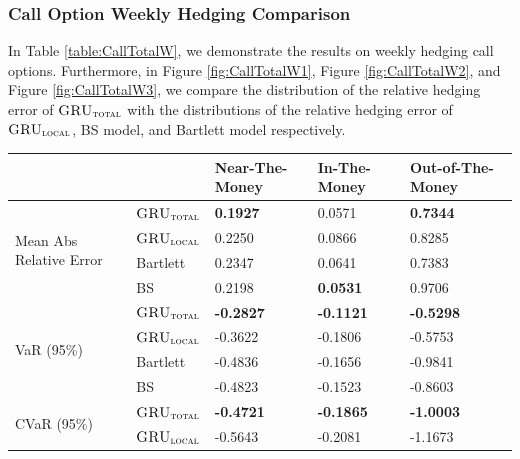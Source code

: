 \documentclass[letterpaper,12pt,titlepage,oneside,final]{book}
\numberwithin{equation}{section}
\theoremstyle{definition}
\newcommand{\modelT}{\textsc{GRU}_{\textsc{total}}}
\newcommand{\modelL}{\textsc{GRU}_{\textsc{local}}}
\begin{document}
\subsubsection{Call Option Weekly Hedging Comparison}
In Table \ref{table:CallTotalW}, we demonstrate the results on weekly hedging call options. Furthermore, in Figure \ref{fig:CallTotalW1}, Figure \ref{fig:CallTotalW2}, and  Figure \ref{fig:CallTotalW3}, we compare the distribution of the relative hedging error of $\modelT$ with the distributions of the relative hedging error of $\modelL$, BS model, and Bartlett model respectively.
\begin{table}[htp!]
	\centering
	\begin{tabular}{ll|l|l|l|}
		\cline{3-5}
		&          & Near-The-Money   & In-The-Money     & Out-of-The-Money \\ \hline
		\multicolumn{1}{|l|}{\multirow{4}{*}{Mean Abs Relative Error}} & $\modelT$    & \textbf{0.1927}  & 0.0571  & \textbf{0.7344}  \\  
		\multicolumn{1}{|l|}{}                                & $\modelL$    & 0.2250           & 0.0866           & 0.8285           \\  
		\multicolumn{1}{|l|}{}                                & Bartlett & 0.2347           & 0.0641           & 0.7383           \\  
		\multicolumn{1}{|l|}{}                                & BS       & 0.2198           &\textbf{0.0531}           & 0.9706           \\ \hline
		\multicolumn{1}{|l|}{\multirow{4}{*}{VaR (95\%)}}     & $\modelT$    & \textbf{-0.2827} & \textbf{-0.1121} & \textbf{-0.5298} \\  
		\multicolumn{1}{|l|}{}                                & $\modelL$    & -0.3622          & -0.1806          & -0.5753          \\  
		\multicolumn{1}{|l|}{}                                & Bartlett & -0.4836          & -0.1656          & -0.9841          \\  
		\multicolumn{1}{|l|}{}                                & BS       & -0.4823          & -0.1523          & -0.8603          \\ \hline
		\multicolumn{1}{|l|}{\multirow{4}{*}{CVaR (95\%)}}    & $\modelT$    & \textbf{-0.4721} & \textbf{-0.1865} & \textbf{-1.0003} \\  
		\multicolumn{1}{|l|}{}                                & $\modelL$    & -0.5643          & -0.2081          & -1.1673          \\  

\end{tabular}
\end{table}
\end{document}
